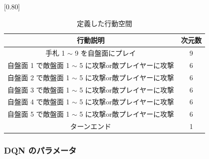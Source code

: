 \documentclass[12pt]{jarticle}
\begin{document}
  \begin{table}[t]
    \centering
    \caption{定義した行動空間}
    \vspace{-0.3cm}
    \label{table:action}
    \scalebox{0.80}[0.80]{
      \begin{tabular}{|c|c|}
        \hline
        行動説明                          & 次元数        \\ \hline \hline
        手札 1 $\sim$ 9 を自盤面にプレイ             & 9          \\ \hline
        自盤面 1 で敵盤面 1 $\sim$ 5 に攻撃or敵プレイヤーに攻撃    & 6          \\ \hline
        自盤面 2 で敵盤面 1 $\sim$ 5 に攻撃or敵プレイヤーに攻撃    & 6          \\ \hline
        自盤面 3 で敵盤面 1 $\sim$ 5 に攻撃or敵プレイヤーに攻撃    & 6          \\ \hline
        自盤面 4 で敵盤面 1 $\sim$ 5 に攻撃or敵プレイヤーに攻撃    & 6          \\ \hline
        自盤面 5 で敵盤面 1 $\sim$ 5 に攻撃or敵プレイヤーに攻撃    & 6          \\ \hline
        ターンエンド & 1 \\ \hline
        \end{tabular}
    }
      \end{table}

\subsubsection{DQN のパラメータ}
\end{document}
